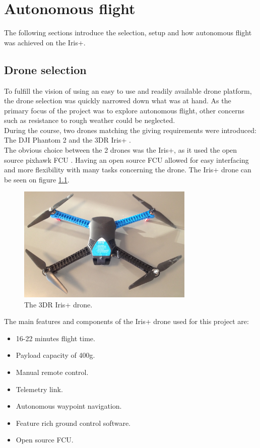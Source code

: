 \chapter{Autonomous flight}
The following sections introduce the selection, setup and how autonomous flight was achieved on
the Iris+.

\section{Drone selection}
To fulfill the vision of using an easy to use and readily available drone platform,
the drone selection was quickly narrowed down what was at hand. As the primary focus of the project was to
explore autonomous flight, other concerns such as resistance to rough weather could be neglected.
\\During the course, two drones matching the giving requirements were introduced: The DJI Phantom 2
\cite{Ref:dji} and the 3DR Iris+ \cite{Ref:3dr}.\\
The obvious choice between the 2 drones was the Iris+, as it used the open source pixhawk FCU
\cite{Ref:px4}. Having an open source FCU allowed for easy interfacing and more flexibility with
many tasks concerning the drone. The Iris+ drone can be seen on figure \ref{fig:iris}.
\\

\begin{figure}[H]
  \centering
    \includegraphics[width=0.75\textwidth]{./Images/iris}
  \caption{The 3DR Iris+ drone.}
  \label{fig:iris}
\end{figure}

\newpage

The main features and components of the Iris+ drone used for this project are:
\begin{itemize}
\item 16-22 minutes flight time.
\item Payload capacity of 400g.
\item Manual remote control.
\item Telemetry link.
\item Autonomous waypoint navigation.
\item Feature rich ground control software.
\item Open source FCU. %
\end{itemize}



